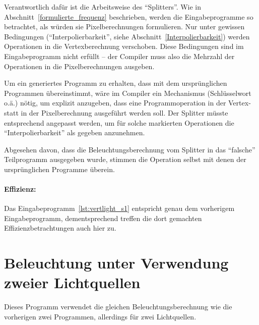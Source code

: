 \documentclass[twoside,a4paper,fleqn,12pt]{book}
\begin{document}
Verantwortlich dafür ist die Arbeitsweise des "`Splitters"'. Wie in Abschnitt~\ref{formulierte_frequenz} beschrieben,
werden die Eingabeprogramme so betrachtet, als würden sie Pixelberechnungen formulieren.
Nur unter gewissen Bedingungen ("`Interpolierbarkeit"', siehe Abschnitt~\ref{Interpolierbarkeit}) werden
Operationen in die Vertexberechnung verschoben. Diese Bedingungen sind im Eingabeprogramm nicht erfüllt --
der Compiler muss also die Mehrzahl der Operationen in die Pixelberechnungen ausgeben.

Um ein generiertes Programm zu erhalten, dass mit dem ursprünglichen Programmen übereinstimmt, wäre im Compiler ein Mechanismus
(Schlüsselwort o.ä.) nötig, um explizit anzugeben, dass eine Programmoperation in der Vertex- statt in der Pixelberechnung ausgeführt werden soll.
Der Splitter müsste entsprechend angepasst werden, um für solche markierten Operationen die "`Interpolierbarkeit"' als gegeben anzunehmen.

Abgesehen davon, dass die Beleuchtungsberechnung vom Splitter in das "`falsche"' Teilprogramm ausgegeben wurde,
stimmen die Operation selbst mit denen der ursprünglichen Programme überein.

\paragraph{Effizienz:}
Das Eingabeprogramm~\ref{lst:vertlight_s1} entspricht genau dem vorherigem Eingabeprogramm, dementsprechend treffen
die dort gemachten Effizienzbetrachtungen auch hier zu.

\section{Beleuchtung unter Verwendung zweier Lichtquellen}

Dieses Programm verwendet die gleichen Beleuchtungsberechnung wie die vorherigen zwei Programmen,
allerdings für zwei Lichtquellen.


{}

{}
\end{document}
